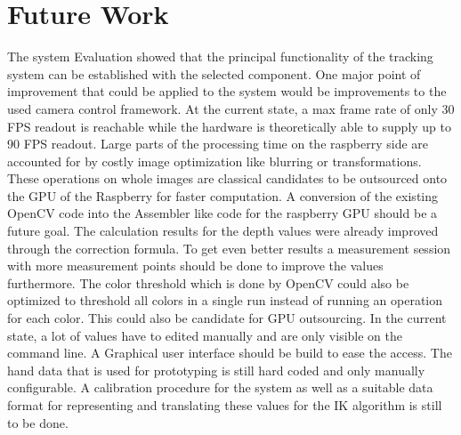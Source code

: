 \chapter{Future Work}
The system Evaluation showed that the principal functionality of the tracking system can be established with the selected component. One major point of improvement that could be applied to the system would be improvements to the used camera control framework. At the current state, a max frame rate of only 30 FPS readout is reachable while the hardware is theoretically able to supply up to 90 FPS readout. 
Large parts of the processing time on the raspberry side are accounted for by costly image optimization like blurring or transformations. These operations on whole images are classical candidates to be outsourced onto the GPU of the Raspberry for faster computation. A conversion of the existing OpenCV code into the Assembler like code for the raspberry GPU should be a future goal.
The calculation results for the depth values were already improved through the correction formula. To get even better results a measurement session with more measurement points should be done to improve the values furthermore.
The color threshold which is done by OpenCV could also be optimized to threshold all colors in a single run instead of running an operation for each color. This could also be candidate for GPU outsourcing.
In the current state, a lot of values have to edited manually and are only visible on the command line. A Graphical user interface should be build to ease the access.
The hand data that is used for prototyping is still hard coded and only manually configurable. A calibration procedure for the system as well as a suitable data format for representing and translating these values for the IK algorithm is still to be done.
